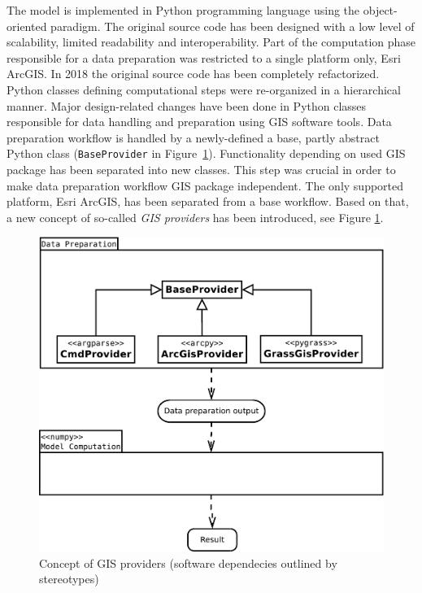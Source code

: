 The model is implemented in Python programming language using the
object-oriented paradigm. The original source code has been designed
with a low level of scalability, limited readability and
interoperability. Part of the computation phase responsible for a data
preparation was restricted to a single platform only, Esri ArcGIS. In
2018 the original source code has been completely refactorized. Python
classes defining computational steps were re-organized in a
hierarchical manner. Major design-related changes have been done in
Python classes responsible for data handling and preparation using GIS
software tools. Data preparation workflow is handled by a
newly-defined a base, partly abstract Python class ({\tt BaseProvider}
in Figure~\ref{fig:uml_diagram}). Functionality depending on used
GIS package has been separated into new classes. This step was crucial
in order to make data preparation workflow GIS package
independent. The only supported platform, Esri ArcGIS, has been
separated from a base workflow. Based on that, a new concept of
so-called {\em GIS providers} has been introduced, see
Figure \ref{fig:uml_diagram}. 

\begin{figure}[ht!]
  \begin{center}
    \includegraphics[width=0.9\columnwidth]{figures/uml_diagram.pdf}
    \caption{Concept of GIS providers (software dependecies outlined by stereotypes)}
    \label{fig:uml_diagram}
  \end{center}
\end{figure}

